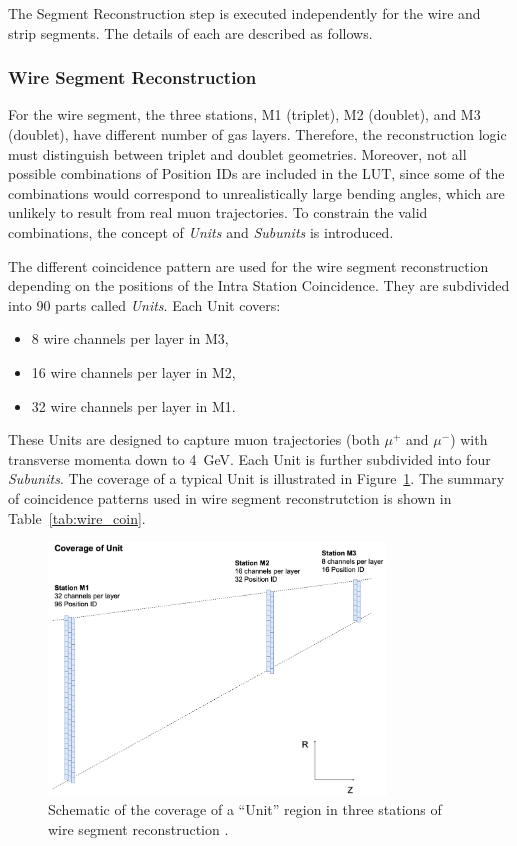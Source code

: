 The Segment Reconstruction step is executed independently for the wire and strip segments. The details of each are described as follows.

\subsubsection{Wire Segment Reconstruction}

For the wire segment, the three stations, M1 (triplet), M2 (doublet), and M3 (doublet), have different number of gas layers. Therefore, the reconstruction logic must distinguish between triplet and doublet geometries. Moreover, not all possible combinations of Position IDs are included in the LUT, since some of the combinations would correspond to unrealistically large bending angles, which are unlikely to result from real muon trajectories. To constrain the valid combinations, the concept of \textit{Units} and \textit{Subunits} is introduced.

The different coincidence pattern are used for the wire segment reconstruction depending on the positions of the Intra Station Coincidence. They are subdivided into 90 parts called \textit{Units}. Each Unit covers:
\begin{itemize}
  \item 8 wire channels per layer in M3,
  \item 16 wire channels per layer in M2,
  \item 32 wire channels per layer in M1.
\end{itemize}
These Units are designed to capture muon trajectories (both $\mu^+$ and $\mu^-$) with transverse momenta down to 4~GeV. Each Unit is further subdivided into four \textit{Subunits}. The coverage of a typical Unit is illustrated in Figure~\ref{fig:wire_unit}. The summary of coincidence patterns used in wire segment reconstrutction is shown in Table~\ref{tab:wire_coin}.


\begin{figure}[htbp]
  \centering
  \includegraphics[width=0.8\textwidth]{figs/chapter5/wire_unit.png}
  \caption{Schematic of the coverage of a ``Unit'' region in three stations of wire segment reconstruction \cite{EndcapSLPDR}.}
  \label{fig:wire_unit}
\end{figure}

